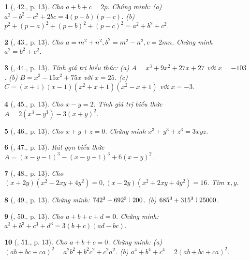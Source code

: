\documentclass{article}
\newtheorem{baitoan}{}
\DeclareRobustCommand{\divby}{%
	\mathrel{\vbox{\baselineskip.65ex\lineskiplimit0pt\hbox{.}\hbox{.}\hbox{.}}}%
}
\begin{document}
\begin{baitoan}[\cite{Tuyen_Toan_8}, 42., p. 13]
	Cho $a + b + c = 2p$. Chứng minh: (a) $a^2 - b^2 - c^2 + 2bc = 4(p - b)(p - c)$. (b) $p^2 + (p - a)^2 + (p - b)^2 + (p - c)^2 = a^2 + b^2 + c^2$.
\end{baitoan}

\begin{baitoan}[\cite{Tuyen_Toan_8}, 43., p. 13]
	Cho $a = m^2 + n^2,b^2 = m^2 - n^2,c = 2mn$. Chứng minh $a^2 = b^2 + c^2$.
\end{baitoan}

\begin{baitoan}[\cite{Tuyen_Toan_8}, 44., p. 13]
	Tính giá trị biểu thức: (a) $A = x^3 + 9x^2 + 27x + 27$ với $x = -103$. (b) $B = x^3 - 15x^2 + 75x$ với $x = 25$. (c) $C = (x + 1)(x - 1)(x^2 + x + 1)(x^2 - x + 1)$ với $x = -3$.
\end{baitoan}

\begin{baitoan}[\cite{Tuyen_Toan_8}, 45., p. 13]
	Cho $x - y = 2$. Tính giá trị biểu thức $A = 2(x^3 - y^3) - 3(x + y)^2$.
\end{baitoan}

\begin{baitoan}[\cite{Tuyen_Toan_8}, 46., p. 13]
	Cho $x + y + z = 0$. Chứng minh $x^3 + y^3 + z^3 = 3xyz$.
\end{baitoan}

\begin{baitoan}[\cite{Tuyen_Toan_8}, 47., p. 13]
	Rút gọn biểu thức $A = (x - y - 1)^3 - (x - y + 1)^3 + 6(x - y)^2$.
\end{baitoan}

\begin{baitoan}[\cite{Tuyen_Toan_8}, 48., p. 13]
	Cho $(x + 2y)(x^2 - 2xy + 4y^2) = 0,(x - 2y)(x^2 + 2xy + 4y^2) = 16$. Tìm $x,y$.
\end{baitoan}

\begin{baitoan}[\cite{Tuyen_Toan_8}, 49., p. 13]
	Chứng minh: $742^3 - 692^3\divby200$. (b) $685^3 + 315^3\divby25000$.
\end{baitoan}

\begin{baitoan}[\cite{Tuyen_Toan_8}, 50., p. 13]
	Cho $a + b + c + d = 0$. Chứng minh: $a^3 + b^3 + c^3 + d^3 = 3(b + c)(ad - bc)$.
\end{baitoan}

\begin{baitoan}[\cite{Tuyen_Toan_8}, 51., p. 13]
	Cho $a + b + c = 0$. Chứng minh: (a) $(ab + bc + ca)^2 = a^2b^2 + b^2c^2 + c^2a^2$. (b) $a^4 + b^4 + c^4 = 2(ab + bc + ca)^2$.
\end{baitoan}
\end{document}
